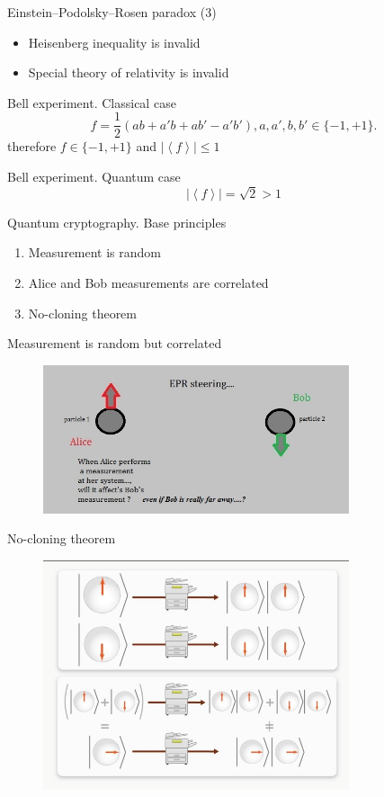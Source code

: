 \documentclass[10pt,pdf,hyperref={unicode}]{beamer}
\begin{document}
\begin{frame}{Einstein–Podolsky–Rosen paradox (3)}
  \begin{itemize}
  \item Heisenberg inequality is invalid
  \item Special theory of relativity is invalid
  \end{itemize}
\end{frame}


\begin{frame}{Bell experiment. Classical case}
\[
f = \frac{1}{2}\left(
a b + a' b + a b' - a' b'
\right), a,a',b,b' \in \{-1, +1\}.
\]
therefore
\(
f \in \{-1, +1\}
\)
and
\(
\left|\left<f\right>\right| \le 1
\)
\end{frame}

\begin{frame}{Bell experiment. Quantum case}
\[
\left|\left<f\right>\right| = \sqrt{2} > 1
\]
\end{frame}

\begin{frame}{Quantum cryptography. Base principles}
  \begin{enumerate}
  \item Measurement is random
  \item Alice and Bob measurements are correlated
  \item No-cloning theorem
  \end{enumerate}
\end{frame}

\begin{frame}{Measurement is random but correlated}
 \begin{figure} 
   \includegraphics[width=90mm,scale=0.5]{epr3.jpg}
  \end{figure}
\end{frame}

\begin{frame}{No-cloning theorem}
 \begin{figure} 
   \includegraphics[width=90mm,scale=0.5]{noclone.png}
  \end{figure}
\end{frame}
\end{document}
